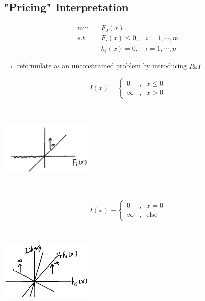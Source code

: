 \subsection{"Pricing" Interpretation}


\begin{align*}
	\min \quad & F_0(x)\\
	s.t.\quad & F_i(x) \leq 0,\quad i = 1,\cdots,m\\
	& h_i(x) = 0,\quad i = 1,\cdots,p
\end{align*}

$\rightarrow$ reformulate as an unconstrained problem by introducing $I\& \tilde{I}$


\begin{equation}
\label{eq6}
I(x)=\left\{
\begin{aligned}
0 & , & x\leq 0 \\
\infty & , & x>0
\end{aligned}
\right.
\end{equation}

\begin{marginfigure}
	\centering
	\includegraphics[width=1.8in,height=1.8in]{figures/ch10/figure1127_2.png}
\end{marginfigure}

\begin{equation}
\label{eq6}
\tilde{I}(x)=\left\{
\begin{aligned}
0 & , & x= 0 \\
\infty & , & \text{else}
\end{aligned}
\right.
\end{equation}


\begin{marginfigure}
	\centering
	\includegraphics[width=1.8in,height=1.8in]{figures/ch10/figure1127_3.png}
\end{marginfigure}


